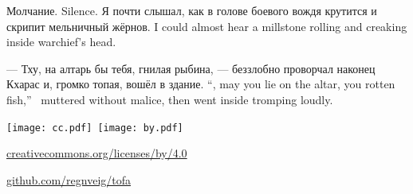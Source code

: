 {Молчание.}
{Silence.}
{Я почти слышал, как в голове боевого вождя крутится и скрипит мельничный жёрнов.}
{I could almost hear a millstone rolling and creaking inside warchief's head.}

{--- Тху, на алтарь бы тебя, гнилая рыбина, --- беззлобно проворчал наконец Кхарас и, громко топая, вошёл в здание.}
{``\Tchu, may you lie on the altar, you rotten fish,'' \Kcharas\ muttered without malice, then went inside tromping loudly.}

\newpage\thispagestyle{plain}
{\centering

\texttt{[image: cc.pdf]}~\texttt{[image: by.pdf]}

\vspace{0.2em}

{\par}
{ \href{https://creativecommons.org/licenses/by/4.0/deed.ru}{creativecommons.org/licenses/by/4.0}\par}

\vfill

{\large\bookauthor\par}
\vspace{0.5em}
{\Large\textbf{\booktitle}\par}

\vfill

{ \textit{\bookstarted}\par}
{ \textit{\bookfinished}\par}
{ \href{https://github.com/regnveig/tofa}{github.com/regnveig/tofa}\par}

\vfill

{\par}
{\par}
{\par}

}
